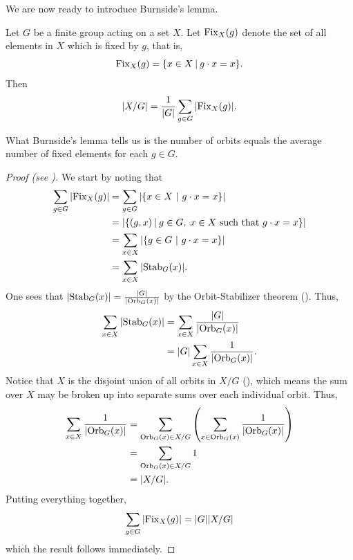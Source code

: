 We are now ready to introduce Burnside's lemma.
\begin{lemma}[Burnside]\label{lemma-burnside}
    Let $G$ be a finite group acting on a set $X$. Let $\mathrm{Fix}_{X}(g)$ denote the set of all elements in $X$ which is fixed by $g$, that is,
    \[
        \Fix{X}{g} = \{x \in X \vert g\cdot x = x\}.
    \]
    Then
    \[
        |X/G| = \frac{1}{|G|}\sum_{g\in G} |\mathrm{Fix}_{X}(g)|.
    \]
\end{lemma}
What Burnside's lemma tells us is the number of orbits equals the average number of fixed elements for each $g \in G$.
\begin{proof}[Proof (see \cite{proofwiki_burnsideslemma})]
    We start by noting that
    \begin{align*}
        \sum_{g\in G} |\Fix{X}{g}| &= \sum_{g\in G} |\{x \in X \vertalt g\cdot x = x\}|\\
        &= |\{(g, x) \vert g \in G,\; x \in X \text{ such that } g\cdot x = x\}|\\
        &= \sum_{x\in X} |\{g \in G \vertalt g\cdot x = x\}|\\
        &= \sum_{x\in X} |\Stab{G}{x}|.
    \end{align*}
    One sees that $|\mathrm{Stab}_{G}(x)| = \frac{|G|}{|\mathrm{Orb}_{G}(x)|}$ by the Orbit-Stabilizer theorem (). Thus,
    \begin{align*}
        \sum_{x\in X} |\mathrm{Stab}_{G}(x)| &= \sum_{x\in X} \frac{|G|}{|\mathrm{Orb}_{G}(x)|}\\
        &= |G|\sum_{x\in X} \frac{1}{|\mathrm{Orb}_{G}(x)|}.
    \end{align*}
    Notice that $X$ is the disjoint union of all orbits in $X/G$ (), which means the sum over $X$ may be broken up into separate sums over each individual orbit. Thus,
    \begin{align*}
        \sum_{x\in X} \frac{1}{|\mathrm{Orb}_{G}(x)|} &= \sum_{\mathrm{Orb}_{G}(x) \in X/G}\left(\sum_{x \in \mathrm{Orb}_{G}(x)} \frac{1}{|\mathrm{Orb}_{G}(x)|}\right)\\
        &= \sum_{\mathrm{Orb}_{G}(x) \in X/G} 1\\
        &= |X/G|.
    \end{align*}
    Putting everything together,
    \[
        \sum_{g\in G} |\mathrm{Fix}_{X}(g)| = |G||X/G|
    \]
    which the result follows immediately.
\end{proof}

